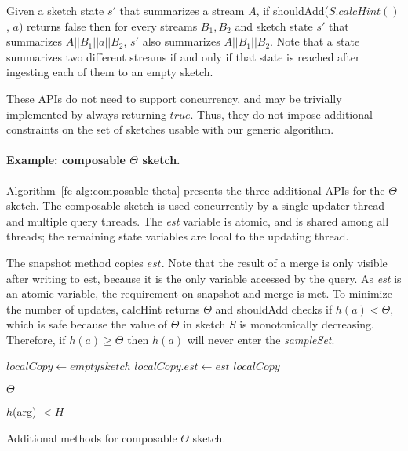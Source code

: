 		Given a sketch state $s'$ that summarizes a stream $A$, if shouldAdd($S.calcHint()$, $a$) returns false then
    for every streams $B_1,B_2$ and sketch state $s'$ that summarizes $A||B_1||a||B_2$,
    $s'$ also summarizes $A||B_1||B_2$. Note that a state summarizes two different streams if and only if that state is reached
		after ingesting each of them to an empty sketch.

These APIs do not need to support concurrency, and may be trivially implemented by always returning $true$.
Thus, they do not impose additional constraints on the set of sketches usable with our generic algorithm.


\paragraph{Example: composable $\Theta$ sketch.}
 
Algorithm~\ref{fc-alg:composable-theta} presents the three additional APIs for the $\Theta$ sketch.
The composable sketch is used concurrently by a single updater thread and multiple query threads. 
The \emph{est} variable is atomic, and is shared among all threads; the remaining state variables are local to the updating thread.

The snapshot method copies $\mathit{est}$. Note that the
result of a merge is only visible after writing to est, because it is the only variable accessed by
the query. As \emph{est} is an atomic variable, the requirement on snapshot and merge is
met. To minimize the number of updates, calcHint returns $\Theta$
and shouldAdd checks if $h(a) < \Theta$, which is safe because the value of
$\Theta$ in sketch $S$ is monotonically decreasing. Therefore, if $h(a) \geq \Theta$
then $h(a)$ will never enter the \emph{sampleSet}.

\begin{algorithm}[htb]
    \small
    \begin{algorithmic}[1]
       
            \State $localCopy \leftarrow empty sketch$
            \State $localCopy.\mathit{est} \leftarrow \mathit{est}$
            \State \Return $localCopy$
        \EndProcedure
    
            \State \Return $\Theta$
        \EndProcedure
    
            \State \Return $h$(arg) $< H$
        \EndProcedure

    \end{algorithmic}
    \caption{Additional methods for composable $\Theta$ sketch.}
    \label{fc-alg:composable-theta}
\end{algorithm}


